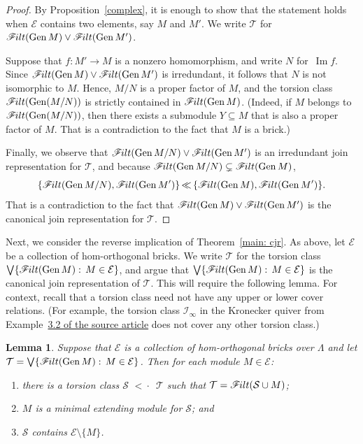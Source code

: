 \documentclass[10pt]{amsart}
\providecommand{\1}{}
\DeclareMathOperator{\image}{Im}
\newcommand{\calE}{\mathcal{E}}
\newcommand{\calI}{\mathcal{I}}
\newcommand{\calS}{\mathcal{S}}
\newcommand{\calT}{\mathcal{T}}
\newcommand{\filt}{\mathscr{F}\Mk ilt}
\newcommand{\covered}{{\,\,<\!\!\!\!\cdot\,\,\,}}
\newcommand{\join}{\vee}
\renewcommand{\Join}{\bigvee}
\newcommand{\strictrefines}{{\,{\ll}\,}}
\newcommand{\Gen}{\operatorname{Gen}}
\renewcommand{\1}{\hat{1}}
\newcommand{\0}{\hat{0}}
\newcommand*{\Mk}{\mkern -2mu}
\newtheorem{lemma}[theorem]{Lemma}
\theoremstyle{definition}
\begin{document}
\begin{proof}
By Proposition~\ref{complex}, it is enough to show that the statement holds when $\calE$ contains two elements, say $M$ and $M'$.
We write $\calT$ for $\filt(\Gen M) \join \filt(\Gen M')$.

Suppose that $f:M'\to M$ is a nonzero homomorphism, and write $N$ for~$\image f$.
Since $\filt(\Gen M) \join \filt(\Gen M')$ is irredundant, it follows that $N$ is not isomorphic to $M$.
Hence, $M/N$ is a proper factor of $M$, and the torsion class $\filt(\Gen(M/N))$ is strictly contained in $\filt(\Gen M)$.
(Indeed, if $M$ belongs to $\filt(\Gen(M/N))$, then there exists a submodule $Y\subseteq M$ that is also a proper factor of $M$.
That is a contradiction to the fact that $M$ is a brick.)

Finally, we observe that $\filt(\Gen M/N) \join \filt(\Gen M')$ is an irredundant join representation for $\calT$, and because $\filt(\Gen M/N) \subsetneq \filt(\Gen M)$,
$$\{\filt(\Gen M/N), \filt(\Gen M')\} \strictrefines \{\filt(\Gen M), \filt(\Gen M')\}.$$ 
That is a contradiction to the fact that $\filt(\Gen M)\join \filt(\Gen M')$ is the canonical join representation for $\calT$.
\end{proof}

Next, we consider the reverse implication of Theorem~\ref{main: cjr}.
As above, let $\calE$ be a collection of hom-orthogonal bricks.
We write $\calT$ for the torsion class $\Join \{\filt(\Gen M):\, M\in
\calE\}$, and argue that $\Join \{\filt(\Gen M):\, M\in \calE\}$ is the
canonical join representation of $\calT$.
This will require the following lemma. 
For context, recall that a torsion class need not have any upper or lower cover relations.
(For example, the torsion class $\calI_\infty$ in the Kronecker quiver
from Example~\href{https://doi.org/10.5802/alco.72}{3.2 of the source article} does not cover any other torsion class.)

\begin{lemma}\label{lem:join-has-lower-faces}
Suppose that $\calE$ is a collection of hom-orthogonal bricks over
$\Lambda$ and let $\calT = \Join \{\filt(\Gen M):\,M\in \calE\}$.
Then for each module $M\in \calE$:
\begin{enumerate}
\item there is a torsion class $\calS\covered \calT$ such that $\calT = \filt(\calS \cup M)$;
 \item $M$ is a minimal extending module for $\calS$; and
 \item $\calS$ contains $\calE \setminus \{M\}$.
 \end{enumerate}
\end{lemma}
\end{document}
